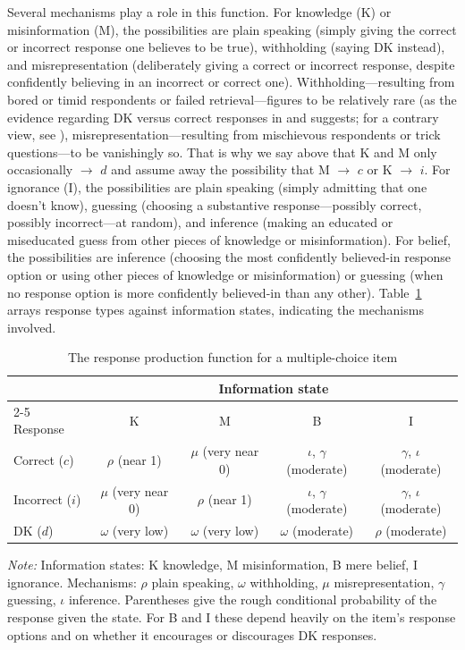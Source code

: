 \documentclass[11pt]{article}
\begin{document}
Several mechanisms play a role in this function. For knowledge (K) or misinformation (M), the possibilities are plain speaking (simply giving the correct or incorrect response one believes to be true), withholding (saying DK instead), and misrepresentation (deliberately giving a correct or incorrect response, despite confidently believing in an incorrect or correct one). Withholding---resulting from bored or timid respondents or failed retrieval---figures to be relatively rare (as the evidence regarding DK versus correct responses in \citealt{luskin2011} and \citealt{sturgis2008} suggests; for a contrary view, see \citealt{mondak1999}), misrepresentation---resulting from mischievous respondents or trick questions---to be vanishingly so. That is why we say above that K and M only occasionally $\rightarrow$ $d$ and assume away the possibility that M $\rightarrow$ $c$ or K $\rightarrow$ $i$. For ignorance (I), the possibilities are plain speaking (simply admitting that one doesn't know), guessing (choosing a substantive response---possibly correct, possibly incorrect---at random), and inference (making an educated or miseducated guess from other pieces of knowledge or misinformation). For belief, the possibilities are inference (choosing the most confidently believed-in response option or using other pieces of knowledge or misinformation) or guessing (when no response option is more confidently believed-in than any other). Table~\ref{tab:rpf} arrays response types against information states, indicating the mechanisms involved.

\begin{table}[t]
\centering
\caption{The response production function for a multiple-choice item}
\label{tab:rpf}
\small
\begin{tabular}{lcccc}
\toprule
& \multicolumn{4}{c}{Information state} \\
\cmidrule(lr){2-5}
Response & K & M & B & I \\
\midrule
Correct ($c$) & $\rho$ (near 1) & $\mu$ (very near 0) & $\iota$, $\gamma$ (moderate) & $\gamma$, $\iota$ (moderate) \\
Incorrect ($i$) & $\mu$ (very near 0) & $\rho$ (near 1) & $\iota$, $\gamma$ (moderate) & $\gamma$, $\iota$ (moderate) \\
DK ($d$) & $\omega$ (very low) & $\omega$ (very low) & $\omega$ (moderate) & $\rho$ (moderate) \\
\bottomrule
\end{tabular}
\begin{minipage}{0.92\linewidth}
\vspace{0.5em}\footnotesize \emph{Note:} Information states: K knowledge, M misinformation, B mere belief, I ignorance. Mechanisms: $\rho$ plain speaking, $\omega$ withholding, $\mu$ misrepresentation, $\gamma$ guessing, $\iota$ inference. Parentheses give the rough conditional probability of the response given the state. For B and I these depend heavily on the item's response options and on whether it encourages or discourages DK responses.
\end{minipage}
\end{table}
\end{document}
